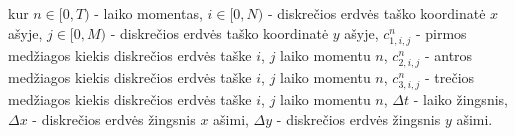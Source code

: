\documentclass{VUMIFInfKursinis}
\begin{document}
kur $n\in[0, T)$ - laiko momentas, 
$i\in[0,N)$ - diskrečios erdvės taško koordinatė $x$ ašyje,
$j\in[0,M)$ - diskrečios erdvės taško koordinatė $y$ ašyje,
$c^n_{1,i,j}$ - pirmos medžiagos kiekis diskrečios erdvės taške $i$, $j$ laiko momentu $n$,
$c^n_{2,i,j}$ - antros medžiagos kiekis diskrečios erdvės taške $i$, $j$ laiko momentu $n$,
$c^n_{3,i,j}$ - trečios medžiagos kiekis diskrečios erdvės taške $i$, $j$ laiko momentu $n$,
$\Delta t$ - laiko žingsnis,
$\Delta x$ - diskrečios erdvės žingsnis $x$ ašimi,
$\Delta y$ - diskrečios erdvės žingsnis $y$ ašimi.







\printbibliography[heading=bibintoc] %

\appendix  %
\end{document}
